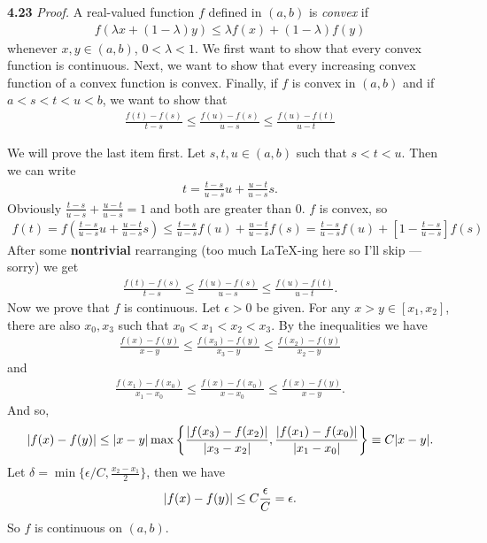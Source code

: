 \documentclass[11pt]{article}
\begin{document}
\noindent \textbf{4.23}
\noindent \textit{Proof.} A real-valued function $f$ defined in $(a,b)$ is \textit{convex} if 
\begin{align*}
f(\lambda x + (1-\lambda)y) \leq \lambda f(x) + (1-\lambda) f(y)
\end{align*} 
whenever $x,y \in (a,b)$, $0 < \lambda < 1$. We first want to show that every convex function is continuous. Next, we want to show that every increasing convex function of a convex function is convex. Finally, if $f$ is convex in $(a,b)$ and if $a<s<t<u<b$, we want to show that
\begin{align*}
\frac{f(t) - f(s)}{t-s} \leq \frac{f(u) - f(s)}{u-s} \leq \frac{f(u) - f(t)}{u-t}
\end{align*}

We will prove the last item first. Let $s,t,u \in (a,b)$ such that $s<t<u$. Then we can write
\begin{align*}
t = \frac{t-s}{u-s}u + \frac{u-t}{u-s}s.
\end{align*}
Obviously $\frac{t-s}{u-s} + \frac{u-t}{u-s} = 1$ and both are greater than 0. $f$ is convex, so
\begin{align*}
f(t) = f\left( \frac{t-s}{u-s}u + \frac{u-t}{u-s}s \right) \leq \frac{t-s}{u-s}f(u) + \frac{u-t}{u-s}f(s) = \frac{t-s}{u-s}f(u) + \left[1-\frac{t-s}{u-s}\right]f(s) 
\end{align*}
After some \textbf{nontrivial} rearranging (too much \LaTeX{}-ing here so I'll skip --- sorry) we get
\begin{align*}
\frac{f(t) - f(s)}{t-s} \leq \frac{f(u) - f(s)}{u-s} \leq \frac{f(u) - f(t)}{u-t}.
\end{align*}
Now we prove that $f$ is continuous. Let $\epsilon > 0$ be given. %
For any $x>y \in [x_1,x_2]$, there are also $x_0,x_3$ such that $x_0 < x_1 < x_2 < x_3$. By the inequalities we have
\begin{align*}
\frac{f(x) - f(y)}{x - y}  \leq  \frac{f(x_3)-f(y)}{x_3-y} \leq \frac{f(x_2)-f(y)}{x_2-y}
\end{align*}
and
\begin{align*}
\frac{f(x_1) - f(x_0)}{x_1 - x_0}  \leq  \frac{f(x)-f(x_0)}{x-x_0} \leq \frac{f(x)-f(y)}{x-y}.
\end{align*}
And so,
\begin{align*}
\abs{f(x) - f(y)} \leq \abs{x-y}\max\left\{ \frac{\abs{f(x_3) - f(x_2)}}{\abs{x_3 - x_2}}, \frac{\abs{f(x_1) - f(x_0)}}{\abs{x_1 - x_0}} \right\} \equiv C\abs{x-y}.
\end{align*}
Let $\delta = \min\{ \epsilon/C , \frac{x_2 - x_1}{2}\}$, then we have 
\begin{align*}
\abs{f(x) - f(y)} \leq C\frac{\epsilon}{C} = \epsilon.
\end{align*}
So $f$ is continuous on $(a,b)$. \\
\end{document}
